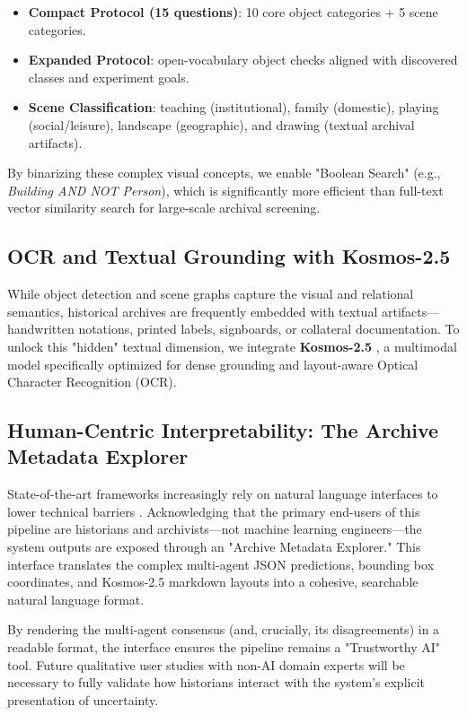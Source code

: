 \documentclass[12pt,onecolumn,a4paper]{IEEEtran}
\begin{document}
\begin{itemize}
    \item \textbf{Compact Protocol (15 questions)}: 10 core object categories + 5 scene categories.
    \item \textbf{Expanded Protocol}: open-vocabulary object checks aligned with discovered classes and experiment goals.
    \item \textbf{Scene Classification}: teaching (institutional), family (domestic), playing (social/leisure), landscape (geographic), and drawing (textual archival artifacts).
\end{itemize}

By binarizing these complex visual concepts, we enable "Boolean Search" (e.g., \textit{Building AND NOT Person}), which is significantly more efficient than full-text vector similarity search for large-scale archival screening.

\subsection{OCR and Textual Grounding with Kosmos-2.5}
While object detection and scene graphs capture the visual and relational semantics, historical archives are frequently embedded with textual artifacts—handwritten notations, printed labels, signboards, or collateral documentation. To unlock this "hidden" textual dimension, we integrate \textbf{Kosmos-2.5} \cite{kosmos2_5_2024}, a multimodal model specifically optimized for dense grounding and layout-aware Optical Character Recognition (OCR).

\subsection{Human-Centric Interpretability: The Archive Metadata Explorer}
State-of-the-art frameworks increasingly rely on natural language interfaces to lower technical barriers \cite{kalusev_multiagent}. Acknowledging that the primary end-users of this pipeline are historians and archivists---not machine learning engineers---the system outputs are exposed through an "Archive Metadata Explorer." This interface translates the complex multi-agent JSON predictions, bounding box coordinates, and Kosmos-2.5 markdown layouts into a cohesive, searchable natural language format. 

By rendering the multi-agent consensus (and, crucially, its disagreements) in a readable format, the interface ensures the pipeline remains a "Trustworthy AI" tool. Future qualitative user studies with non-AI domain experts will be necessary to fully validate how historians interact with the system's explicit presentation of uncertainty.
\end{document}
